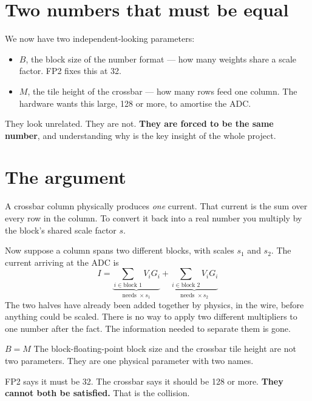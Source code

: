 \documentclass[11pt,a4paper]{report}
\begin{document}
\section{Two numbers that must be equal}

We now have two independent-looking parameters:

\begin{itemize}[leftmargin=1.4em]
  \item $B$, the block size of the number format --- how many weights share a
        scale factor. FP2 fixes this at 32.
  \item $M$, the tile height of the crossbar --- how many rows feed one
        column. The hardware wants this large, 128 or more, to amortise the
        ADC.
\end{itemize}

They look unrelated. They are not. \textbf{They are forced to be the same
number}, and understanding why is the key insight of the whole project.

\section{The argument}

A crossbar column physically produces \emph{one} current. That current is the
sum over every row in the column. To convert it back into a real number you
multiply by the block's shared scale factor $s$.

Now suppose a column spans two different blocks, with scales $s_1$ and $s_2$.
The current arriving at the ADC is
\[
I = \underbrace{\sum_{i \in \text{block 1}} V_i G_i}_{\text{needs }\times s_1}
  + \underbrace{\sum_{i \in \text{block 2}} V_i G_i}_{\text{needs }\times s_2}
\]
The two halves have already been added together by physics, in the wire,
before anything could be scaled. There is no way to apply two different
multipliers to one number after the fact. The information needed to separate
them is gone.

\begin{keybox}{$B = M$}
The block-floating-point block size and the crossbar tile height are not two
parameters. They are one physical parameter with two names.

FP2 says it must be 32. The crossbar says it should be 128 or more.
\textbf{They cannot both be satisfied.} That is the collision.
\end{keybox}
\end{document}
